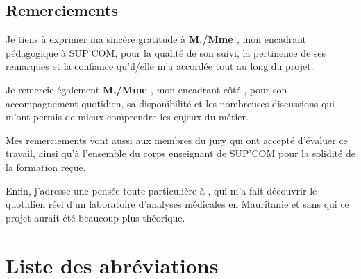 \documentclass[12pt, a4paper, oneside]{report}
\begin{document}
\section*{Remerciements}
Je tiens à exprimer ma sincère gratitude à \textbf{M./Mme
\underline{\hspace{4cm}}}, mon encadrant pédagogique à SUP'COM, pour la
qualité de son suivi, la pertinence de ses remarques et la confiance
qu'il/elle m'a accordée tout au long du projet.

Je remercie également \textbf{M./Mme \underline{\hspace{4cm}}}, mon
encadrant côté \underline{\hspace{3cm}}, pour son accompagnement
quotidien, sa disponibilité et les nombreuses discussions qui m'ont
permis de mieux comprendre les enjeux du métier.

Mes remerciements vont aussi aux membres du jury qui ont accepté
d'évaluer ce travail, ainsi qu'à l'ensemble du corps enseignant de
SUP'COM pour la solidité de la formation reçue.

Enfin, j'adresse une pensée toute particulière à \underline{\hspace{4cm}},
qui m'a fait découvrir le quotidien réel d'un laboratoire d'analyses
médicales en Mauritanie et sans qui ce projet aurait été beaucoup plus
théorique.

\newpage

\renewcommand{\contentsname}{Sommaire}
\tableofcontents
\newpage

\listoffigures
{}
\newpage

\listoftables
{}
\newpage

\chapter*{Liste des abréviations}
\end{document}
